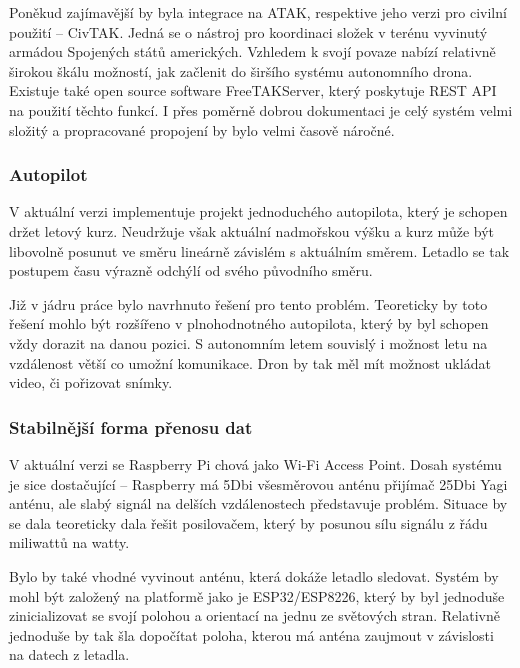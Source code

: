 \documentclass[a4paper,oneside,12pt]{report}
\let\openright=\clearpage
\begin{document}
Poněkud zajímavější by byla integrace na ATAK, respektive jeho verzi pro civilní použití -- CivTAK.
Jedná se o nástroj pro koordinaci složek v terénu vyvinutý armádou Spojených států amerických.
Vzhledem k svojí povaze nabízí relativně širokou škálu možností, jak začlenit do širšího systému autonomního drona.
Existuje také open source software FreeTAKServer, který poskytuje REST API na použití těchto funkcí.
I přes poměrně dobrou dokumentaci je celý systém velmi složitý a propracované propojení by bylo velmi časově náročné.

\subsection{Autopilot}

V aktuální verzi implementuje projekt jednoduchého autopilota, který je schopen držet letový kurz.
Neudržuje však aktuální nadmořskou výšku a kurz může být libovolně posunut ve směru lineárně závislém s aktuálním směrem.
Letadlo se tak postupem času výrazně odchýlí od svého původního směru.

Již v jádru práce bylo navrhnuto řešení pro tento problém.
Teoreticky by toto řešení mohlo být rozšířeno v plnohodnotného autopilota, který by byl schopen vždy dorazit na danou pozici.
S autonomním letem souvislý i možnost letu na vzdálenost větší co umožní komunikace.
Dron by tak měl mít možnost ukládat video, či pořizovat snímky.

\subsection{Stabilnější forma přenosu dat}

V aktuální verzi se Raspberry Pi chová jako Wi-Fi Access Point.
Dosah systému je sice dostačující -- Raspberry má 5Dbi všesměrovou anténu přijímač 25Dbi Yagi anténu, ale slabý signál na delších vzdálenostech představuje problém.
Situace by se dala teoreticky dala řešit posilovačem, který by posunou sílu signálu z řádu miliwattů na watty.

Bylo by také vhodné vyvinout anténu, která dokáže letadlo sledovat.
Systém by mohl být založený na platformě jako je ESP32/ESP8226, který by byl jednoduše zinicializovat se svojí polohou a orientací na jednu ze světových stran.
Relativně jednoduše by tak šla dopočítat poloha, kterou má anténa zaujmout v závislosti na datech z letadla.

\chapter*{}
\setcounter{page}{5} %





\listoffigures
\openright
\end{document}
